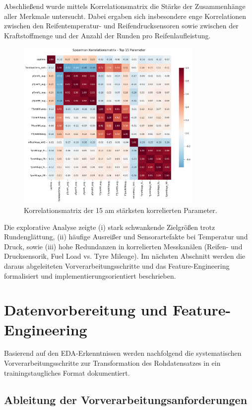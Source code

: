 Abschließend wurde mittels Korrelationsmatrix die Stärke der Zusammenhänge aller Merkmale untersucht. Dabei ergaben sich insbesondere enge Korrelationen zwischen den Reifentemperatur- und Reifendrucksensoren sowie zwischen der Kraftstoffmenge und der Anzahl der Runden pro Reifenlaufleistung. 
\begin{figure}[H]
  \centering
  \includegraphics[width=0.8\textwidth]{graphics/korrelations_matrix_top.png}
  \caption{Korrelationsmatrix der 15 am stärksten korrelierten Parameter.}
  \label{fig:korrelations_matrix}
\end{figure}


Die explorative Analyse zeigte (i) stark schwankende Zielgrößen trotz Rundenglättung, (ii) häufige Ausreißer und Sensorartefakte bei Temperatur und Druck, sowie (iii) hohe Redundanzen in korrelierten Messkanälen (Reifen- und Drucksensorik, Fuel Load vs. Tyre Mileage). Im nächsten Abschnitt werden die daraus abgeleiteten Vorverarbeitungsschritte und das Feature-Engineering formalisiert und implementierungsorientiert beschrieben.



\section{Datenvorbereitung und Feature-Engineering}

Basierend auf den EDA-Erkenntnissen werden nachfolgend die systematischen Vorverarbeitungsschritte zur Transformation des Rohdatensatzes in ein trainingstaugliches Format dokumentiert.

\subsection{Ableitung der Vorverarbeitungsanforderungen}

